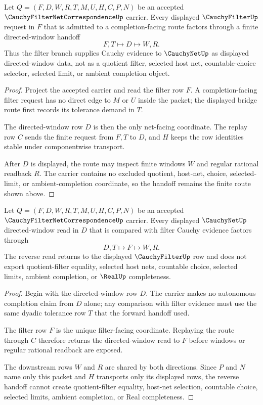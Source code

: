 \begin{theorem}
\label{thm:cauchy-filter-net-correspondence-filter-to-net}
Let $Q=(F,D,W,R,T,M,U,H,C,P,N)$ be an accepted $\CauchyFilterNetCorrespondenceUp$ carrier. Every displayed $\CauchyFilterUp$ request in $F$ that is admitted to a completion-facing route factors through a finite directed-window handoff
$$
F,T \longmapsto D \longmapsto W,R .
$$
Thus the filter branch supplies Cauchy evidence to $\CauchyNetUp$ as displayed directed-window data, not as a quotient filter, selected host net, countable-choice selector, selected limit, or ambient completion object.
\end{theorem}
\begin{proof}
Project the accepted carrier and read the filter row $F$. A completion-facing filter request has no direct edge to $M$ or $U$ inside the packet; the displayed bridge route first records its tolerance demand in $T$.

The directed-window row $D$ is then the only net-facing coordinate. The replay row $C$ sends the finite request from $F,T$ to $D$, and $H$ keeps the row identities stable under componentwise transport.

After $D$ is displayed, the route may inspect finite windows $W$ and regular rational readback $R$. The carrier contains no excluded quotient, host-net, choice, selected-limit, or ambient-completion coordinate, so the handoff remains the finite route shown above.
\end{proof}

\begin{theorem}
\label{thm:cauchy-filter-net-correspondence-net-to-filter}
Let $Q=(F,D,W,R,T,M,U,H,C,P,N)$ be an accepted $\CauchyFilterNetCorrespondenceUp$ carrier. Every displayed $\CauchyNetUp$ directed-window read in $D$ that is compared with filter Cauchy evidence factors through
$$
D,T \longmapsto F \longmapsto W,R .
$$
The reverse read returns to the displayed $\CauchyFilterUp$ row and does not export quotient-filter equality, selected host nets, countable choice, selected limits, ambient completion, or $\RealUp$ completeness.
\end{theorem}
\begin{proof}
Begin with the directed-window row $D$. The carrier makes no autonomous completion claim from $D$ alone; any comparison with filter evidence must use the same dyadic tolerance row $T$ that the forward handoff used.

The filter row $F$ is the unique filter-facing coordinate. Replaying the route through $C$ therefore returns the directed-window read to $F$ before windows or regular rational readback are exposed.

The downstream rows $W$ and $R$ are shared by both directions. Since $P$ and $N$ name only this packet and $H$ transports only its displayed rows, the reverse handoff cannot create quotient-filter equality, host-net selection, countable choice, selected limits, ambient completion, or Real completeness.
\end{proof}

